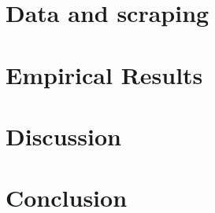 \section{Data and scraping}



\section{Empirical Results}


\section{Discussion}


\section{Conclusion}


\clearpage
\printbibliography
\clearpage

\appendix
\renewcommand\thefigure{\thesection.\arabic{figure}}
\setcounter{figure}{0}
\setcounter{page}{1}



\clearpage



